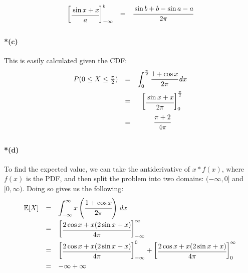 \documentclass[a4paper]{article}
\begin{document}
\begin{equation}
\begin{array}{rcc}
\begin{bmatrix} \cfrac{\sin{x} + x}{a}\end{bmatrix}^{b}_{-\infty} & = & \cfrac{\sin{b} + b - \sin{a} - a}{2\pi}\\[.15in]
\end{array}
\end{equation}

\paragraph{*(c)} This is easily calculated given the CDF:
\begin{equation}
\begin{array}{rcc}
P(0 \le X \le \frac{\pi}{2}) & = & \displaystyle\int^{\frac{\pi}{2}}_{0} \cfrac{1+ \cos{x}}{2\pi} \,dx \\[.15in]
& = & \begin{bmatrix} \cfrac{\sin{x} + x}{2\pi}\end{bmatrix}^{\frac{\pi}{2}}_{0} \\[.15in]
& = & \cfrac{\pi + 2}{4\pi} \\[.15in]
\end{array}
\end{equation}

\paragraph{*(d)} To find the expected value, we can take the antiderivative of $x * f(x)$, where $f(x)$ is the PDF, and then split the problem into two domains: $(-\infty, 0]$ and $[0, \infty)$. Doing so gives us the following:
\begin{equation}
\begin{array}{rcl}
\mathbb{E}[X] & = & \displaystyle\int^{\infty}_{-\infty} x \left( \cfrac{1+ \cos{x}}{2\pi} \right) \,dx \\[.15in]
& = & \begin{bmatrix} \cfrac{2 \cos{x} + x(2 \sin{x} + x)}{4\pi}\end{bmatrix}^{\infty}_{-\infty} \\[.15in]
& = & \begin{bmatrix} \cfrac{2 \cos{x} + x(2 \sin{x} + x)}{4\pi}\end{bmatrix}^{0}_{-\infty} + \begin{bmatrix} \cfrac{2 \cos{x} + x(2 \sin{x} + x)}{4\pi}\end{bmatrix}^{\infty}_{0} \\[.15in]
& = & -\infty + \infty \\[.15in]
\end{array}
\end{equation}
\end{document}
